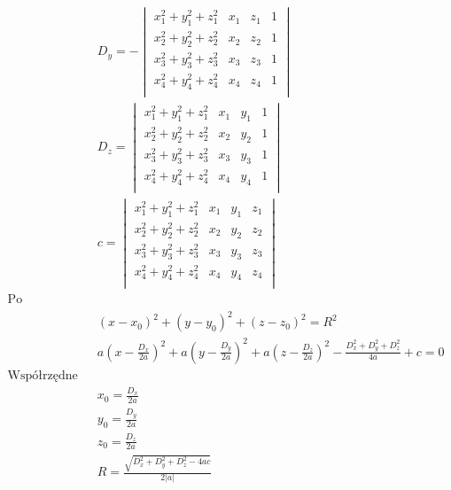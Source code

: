 \begin{equation}
\begin{aligned}
            &D_{y}=-\begin{vmatrix}
                x_{1}^2+y_{1}^2+z_{1}^2 &x_{1}&z_{1}&1 \\
                x_{2}^2+y_{2}^2+z_{2}^2 &x_{2}&z_{2}&1 \\
                x_{3}^2+y_{3}^2+z_{3}^2 &x_{3}&z_{3}&1 \\
                x_{4}^2+y_{4}^2+z_{4}^2 &x_{4}&z_{4}&1 \\
            \end{vmatrix}\\
            &D_{z}=\begin{vmatrix}
                x_{1}^2+y_{1}^2+z_{1}^2 &x_{1}&y_{1}&1 \\
                x_{2}^2+y_{2}^2+z_{2}^2 &x_{2}&y_{2}&1 \\
                x_{3}^2+y_{3}^2+z_{3}^2 &x_{3}&y_{3}&1 \\
                x_{4}^2+y_{4}^2+z_{4}^2 &x_{4}&y_{4}&1 \\
            \end{vmatrix}\\
            &c=\begin{vmatrix}
                x_{1}^2+y_{1}^2+z_{1}^2 &x_{1}&y_{1}&z_{1} \\
                x_{2}^2+y_{2}^2+z_{2}^2 &x_{2}&y_{2}&z_{2} \\
                x_{3}^2+y_{3}^2+z_{3}^2 &x_{3}&y_{3}&z_{3} \\
                x_{4}^2+y_{4}^2+z_{4}^2 &x_{4}&y_{4}&z_{4} \\
            \end{vmatrix}\\
            \text{Po podstawieniu do równania opisującego sferę}\\
            &(x-x_{0})^2+(y-y_{0})^2+(z-z_{0})^2=R^2\\
            &a(x-\frac{D_{x}}{2a})^2+a(y-\frac{D_{y}}{2a})^2+a(z-\frac{D_{z}}{2a})^2-\frac{D_{x}^2+D_{y}^2+D_{z}^2}{4a}+c=0\\
            \text{Współrzędne środka sfery}\\
            &x_{0}=\frac{D_{x}}{2a}\\
            &y_{0}=\frac{D_{y}}{2a}\\
            &z_{0}=\frac{D_{z}}{2a}\\
            &R=\frac{\sqrt{D_{x}^2+D_{y}^2+D_{z}^2-4ac}}{2|a|}
    \end{aligned}
\end{equation}
